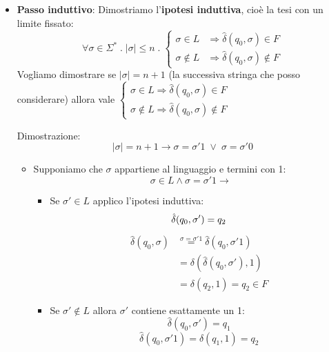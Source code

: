\documentclass[a4paper]{article}
\begin{document}
{\begin{itemize}
    \item \textbf{Passo induttivo}: Dimostriamo l'\textbf{ipotesi induttiva}, cioè
      la tesi con un limite fissato:
      \[
        \forall \sigma \in \Sigma^* \;.\; \left| \sigma  \right| \le n \;.\;
        \begin{cases}
          \sigma \in L &\Rightarrow \hat{\delta}(q_0, \sigma) \in F\\
          \sigma \notin L &\Rightarrow \hat{\delta}(q_0, \sigma) \notin F
        \end{cases}
      \] 
      Vogliamo dimostrare se \( \left| \sigma  \right| = n + 1 \) (la successiva stringa
      che posso considerare) allora vale
      \( 
        \begin{cases}
          \sigma \in L \Rightarrow \hat{\delta}(q_0,\sigma) \in F\\
          \sigma \notin L \Rightarrow \hat{\delta}(q_0,\sigma) \notin F
        \end{cases}
      \) 

      \vspace{1em}
      \noindent
      Dimostrazione:
      \[
        \left| \sigma  \right| = n + 1 \to 
          \sigma = \sigma'1 \; \vee \; \sigma = \sigma'0
      \] 
      \begin{itemize}
        \item Supponiamo che \( \sigma  \) appartiene al linguaggio e termini con 1:
          \[
            \sigma \in L \wedge \sigma  = \sigma'1 \to 
          \] 
          \begin{itemize}
            \item Se \( \sigma' \in L \) applico l'ipotesi induttiva:
              \[
                  \hat{\delta}(q_0, \sigma') = q_2\\
              \] 
              \[
                \begin{aligned}
                  \hat{\delta}(q_0, \sigma) &\stackrel{\sigma = \sigma'1}{=}
                  \hat{\delta}(q_0, \sigma'1)\\
                                            &= \delta(\hat{\delta}(q_0, \sigma'), 1)\\
                                            &= \delta(q_2, 1) = q_2 \in F
                \end{aligned}
              \] 

            \item Se \( \sigma' \notin L \) allora \( \sigma' \) contiene esattamente un 1:
              \[
                \hat{\delta}(q_0, \sigma') = q_1
              \] 
              \[
                \hat{\delta}(q_0, \sigma'1) = \delta(q_1, 1) = q_2
              \] 
          \end{itemize}


\end{itemize}
\end{itemize}}
\end{document}

